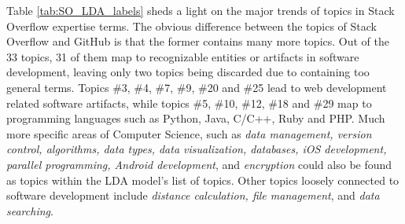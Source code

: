             Table \ref{tab:SO_LDA_labels} sheds a light on the major trends of topics in Stack Overflow expertise terms. The obvious difference between the topics of Stack Overflow and GitHub is that the former contains many more topics. Out of the 33 topics, 31 of them map to recognizable entities or artifacts in software development, leaving only two topics being discarded due to containing too general terms. Topics \#3, \#4, \#7, \#9, \#20 and \#25 lead to web development related software artifacts, while topics \#5, \#10, \#12, \#18 and \#29 map to programming languages such as Python, Java, C/C++, Ruby and PHP. Much more specific areas of Computer Science, such as \emph{data management, version control, algorithms, data types, data visualization, databases, iOS development, parallel programming, Android development}, and \emph{encryption} could also be found as topics within the LDA model's list of topics. Other topics loosely connected to software development include \emph{distance calculation, file management}, and \emph{data searching}.
            
            \begin{table}
              \centering
              \caption{Examples of ambiguous and unambiguous topic words generated by the best performing LDA models for the GitHub and Stack Overflow data sets.} \label{tab:topic_words}
                \vspace{6pt} %
            \end{table}
            
